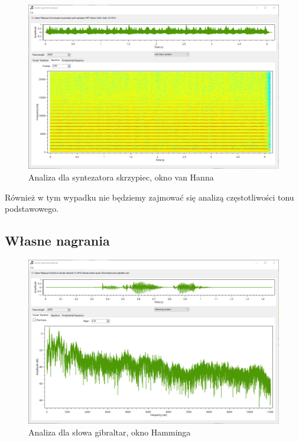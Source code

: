 \documentclass{article}
\begin{document}
\begin{figure}[H]
\includegraphics[width=6in]{scr8.png}
\centering
\caption{Analiza dla syntezatora skrzypiec, okno van Hanna}
\end{figure}

Również w tym wypadku nie będziemy zajmować się analizą częstotliwości tonu podstawowego.

\subsection{Własne nagrania}

\begin{figure}[H]
\includegraphics[width=6in]{scr9.png}
\centering
\caption{Analiza dla słowa gibraltar, okno Hamminga}
\end{figure}
\end{document}
